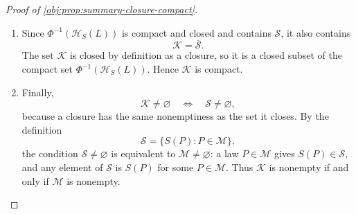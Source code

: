 \begin{proof}[Proof of \cref{obj:prop:summary-closure-compact}]
\begin{enumerate}
\item Since \(\Phi^{-1}(\mathcal H_S(L))\) is compact and closed and contains \(\mathscr S\), it also contains
\[
        \mathcal K=\overline{\mathscr S}.
\]
The set \(\mathcal K\) is closed by definition as a closure, so it is a closed subset of the compact set \(\Phi^{-1}(\mathcal H_S(L))\).  Hence \(\mathcal K\) is compact. %

\item Finally,
\[
        \mathcal K\neq\varnothing
        \quad\Longleftrightarrow\quad
        \mathscr S\neq\varnothing,
\]
because a closure has the same nonemptiness as the set it closes.  By the definition
\[
        \mathscr S=\{S(P):P\in\mathcal M\},
\]
the condition \(\mathscr S\neq\varnothing\) is equivalent to \(\mathcal M\neq\varnothing\): a law \(P\in\mathcal M\) gives \(S(P)\in\mathscr S\), and any element of \(\mathscr S\) is \(S(P)\) for some \(P\in\mathcal M\).  Thus \(\mathcal K\) is nonempty if and only if \(\mathcal M\) is nonempty. %
\end{enumerate}
\end{proof}

